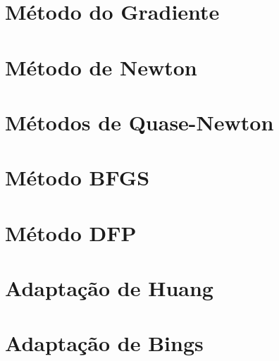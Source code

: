 \section{Método do Gradiente}
\section{Método de Newton}
\section{Métodos de Quase-Newton}
\section{Método BFGS}
\section{Método DFP}
\section{Adaptação de Huang}
\section{Adaptação de Bings}
\newpage